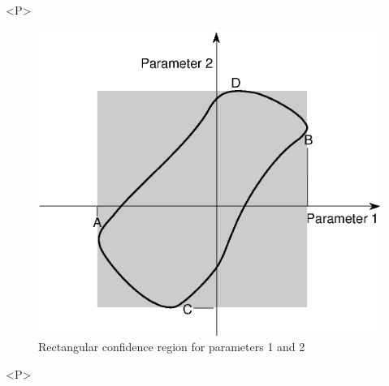 \begin{htmlonly}
\begin{rawhtml}<P>\end{rawhtml}
\begin{figure}
\begin{makeimage}
\includegraphics[width=\linewidth]{minosco2.eps}
\end{makeimage}
\caption{Rectangular confidence region for parameters 1 and 2}
\label{fig:MINosconf2}
\end{figure}

\begin{rawhtml}<P>\end{rawhtml}


\end{htmlonly}
